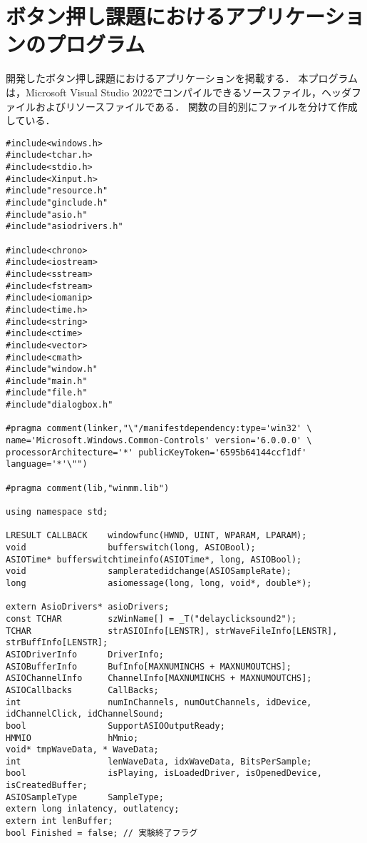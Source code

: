 \chapter{ボタン押し課題におけるアプリケーションのプログラム}
開発したボタン押し課題におけるアプリケーションを掲載する．
本プログラムは，Microsoft Visual Studio 2022でコンパイルできるソースファイル，ヘッダファイルおよびリソースファイルである．
関数の目的別にファイルを分けて作成している．

\begin{lstlisting}[caption=main.cpp]
#include<windows.h>
#include<tchar.h>
#include<stdio.h>
#include<Xinput.h>
#include"resource.h"
#include"ginclude.h"
#include"asio.h"
#include"asiodrivers.h"

#include<chrono>
#include<iostream>
#include<sstream>
#include<fstream>
#include<iomanip>
#include<time.h>
#include<string>
#include<ctime>
#include<vector>
#include<cmath>
#include"window.h"
#include"main.h"
#include"file.h"
#include"dialogbox.h"

#pragma comment(linker,"\"/manifestdependency:type='win32' \
name='Microsoft.Windows.Common-Controls' version='6.0.0.0' \
processorArchitecture='*' publicKeyToken='6595b64144ccf1df' language='*'\"")

#pragma comment(lib,"winmm.lib")

using namespace std;

LRESULT CALLBACK	windowfunc(HWND, UINT, WPARAM, LPARAM);
void				bufferswitch(long, ASIOBool);
ASIOTime* bufferswitchtimeinfo(ASIOTime*, long, ASIOBool);
void				sampleratedidchange(ASIOSampleRate);
long				asiomessage(long, long, void*, double*);

extern AsioDrivers* asioDrivers;
const TCHAR			szWinName[] = _T("delayclicksound2");
TCHAR				strASIOInfo[LENSTR], strWaveFileInfo[LENSTR], strBuffInfo[LENSTR];
ASIODriverInfo		DriverInfo;
ASIOBufferInfo		BufInfo[MAXNUMINCHS + MAXNUMOUTCHS];
ASIOChannelInfo		ChannelInfo[MAXNUMINCHS + MAXNUMOUTCHS];
ASIOCallbacks		CallBacks;
int					numInChannels, numOutChannels, idDevice, idChannelClick, idChannelSound;
bool				SupportASIOOutputReady;
HMMIO				hMmio;
void* tmpWaveData, * WaveData;
int					lenWaveData, idxWaveData, BitsPerSample;
bool				isPlaying, isLoadedDriver, isOpenedDevice, isCreatedBuffer;
ASIOSampleType		SampleType;
extern long inlatency, outlatency;
extern int lenBuffer;
bool Finished = false; // 実験終了フラグ


\end{lstlisting}
